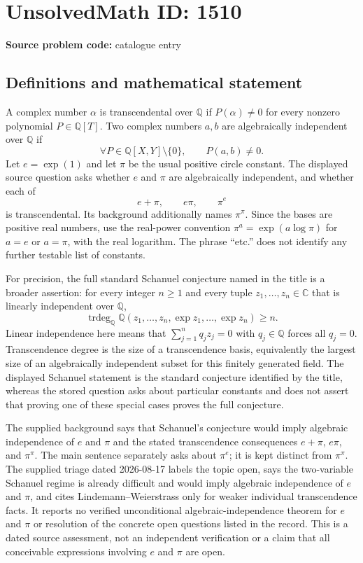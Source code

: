 \documentclass[11pt]{article}
\newcommand{\Q}{\mathbb{Q}}
\newcommand{\C}{\mathbb{C}}
\begin{document}
\section*{UnsolvedMath ID: 1510}
\textbf{Source problem code:} catalogue entry
\subsection{Definitions and mathematical statement}
A complex number $\alpha$ is transcendental over $\Q$ if $P(\alpha)\ne0$ for every nonzero polynomial $P\in\Q[T]$. Two complex numbers $a,b$ are algebraically independent over $\Q$ if
\[
\forall P\in\Q[X,Y]\setminus\{0\},\qquad P(a,b)\ne0.
\]
Let $e=\exp(1)$ and let $\pi$ be the usual positive circle constant. The displayed source question asks whether $e$ and $\pi$ are algebraically independent, and whether each of
\[
e+\pi,\qquad e\pi,\qquad \pi^e
\]
is transcendental. Its background additionally names $\pi^\pi$. Since the bases are positive real numbers, use the real-power convention $\pi^a=\exp(a\log\pi)$ for $a=e$ or $a=\pi$, with the real logarithm. The phrase ``etc.'' does not identify any further testable list of constants.

For precision, the full standard Schanuel conjecture named in the title is a broader assertion: for every integer $n\geq1$ and every tuple $z_1,\ldots,z_n\in\C$ that is linearly independent over $\Q$,
\[
\operatorname{trdeg}_{\Q}\Q(z_1,\ldots,z_n,\exp z_1,\ldots,\exp z_n)\geq n.
\]
Linear independence here means that $\sum_{j=1}^n q_jz_j=0$ with $q_j\in\Q$ forces all $q_j=0$. Transcendence degree is the size of a transcendence basis, equivalently the largest size of an algebraically independent subset for this finitely generated field. The displayed Schanuel statement is the standard conjecture identified by the title, whereas the stored question asks about particular constants and does not assert that proving one of these special cases proves the full conjecture.

The supplied background says that Schanuel's conjecture would imply algebraic independence of $e$ and $\pi$ and the stated transcendence consequences $e+\pi$, $e\pi$, and $\pi^\pi$. The main sentence separately asks about $\pi^e$; it is kept distinct from $\pi^\pi$. The supplied triage dated 2026-08-17 labels the topic open, says the two-variable Schanuel regime is already difficult and would imply algebraic independence of $e$ and $\pi$, and cites Lindemann--Weierstrass only for weaker individual transcendence facts. It reports no verified unconditional algebraic-independence theorem for $e$ and $\pi$ or resolution of the concrete open questions listed in the record. This is a dated source assessment, not an independent verification or a claim that all conceivable expressions involving $e$ and $\pi$ are open.
\end{document}
